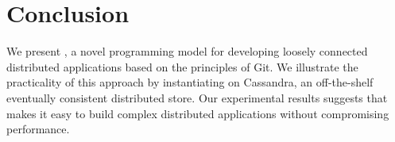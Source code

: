 \section{Conclusion}
\label{sec:conc}

We present \name, a novel programming model for developing loosely connected
distributed applications based on the principles of Git. We illustrate the
practicality of this approach by instantiating \name on Cassandra, an
off-the-shelf eventually consistent distributed store. Our experimental results
suggests that \name makes it easy to build complex distributed applications
without compromising performance.